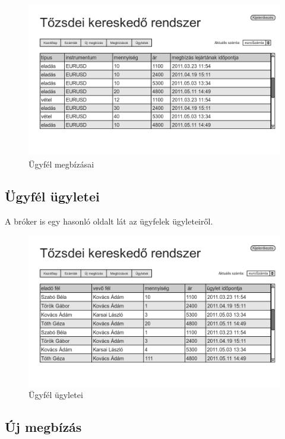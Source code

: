 \begin{figure}[!ht]
\centering
\includegraphics[width=150mm, keepaspectratio]{figures/user_1/megbizasok.png}
\caption{Ügyfél megbízásai}
\label{fig:haromreteg}
\end{figure}


\subsection{Ügyfél ügyletei}
A bróker is egy hasonló oldalt lát az ügyfelek ügyleteiről.

\begin{figure}[!ht]
\centering
\includegraphics[width=150mm, keepaspectratio]{figures/user_1/ugyletek.png}
\caption{Ügyfél ügyletei}
\label{fig:haromreteg}
\end{figure}

\subsection{Új megbízás}

